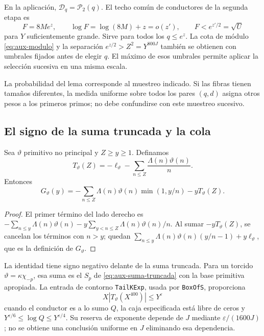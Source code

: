 En la aplicación, $\mathcal D_q=\mathcal P_2(q)$.
El techo común de conductores de la segunda etapa es
\begin{equation}
 F=8Me^z,\qquad \log F=\log(8M)+z=o(z'),\qquad
 F<e^{z'/2}=\sqrt U
 \label{eq:aux-techo}
\end{equation}
para $Y$ suficientemente grande. Sirve para todos los $q\le e^z$.
La cota de módulo \eqref{eq:aux-modulo} y la separación
$e^{z/2}>Z^2=Y^{800J}$ también se obtienen con umbrales fijados
antes de elegir $q$. El máximo de esos umbrales permite aplicar
la selección sucesiva en una misma escala.

La probabilidad del lema corresponde al muestreo indicado. Si las fibras
tienen tamaños diferentes, la medida uniforme sobre todos los pares
$(q,d)$ asigna otros pesos a los primeros primos; no debe confundirse
con este muestreo sucesivo.

\subsection{El signo de la suma truncada y la cola}

\begin{lema}
\label{lem:aux-truncacion}
Sea $\vartheta$ primitivo no principal y $Z\ge y\ge1$. Definamos
\begin{equation}
 T_\vartheta(Z)=-\ell_\vartheta-
                  \sum_{n\le Z}\frac{\Lambda(n)\vartheta(n)}n.
 \label{eq:aux-t}
\end{equation}
Entonces
\begin{equation}
 G_\vartheta(y)
 =-\sum_{n\le Z}\Lambda(n)\vartheta(n)\min(1,y/n)
                                      -yT_\vartheta(Z).
 \label{eq:aux-truncacion}
\end{equation}
\end{lema}

\begin{proof}
El primer término del lado derecho es
$-\sum_{n\le y}\Lambda(n)\vartheta(n)
-y\sum_{y<n\le Z}\Lambda(n)\vartheta(n)/n$.
Al sumar $-yT_\vartheta(Z)$, se cancelan los términos con $n>y$;
quedan $\sum_{n\le y}\Lambda(n)\vartheta(n)(y/n-1)
+y\ell_\vartheta$, que es la definición de $G_\vartheta$.
\end{proof}

La identidad tiene signo negativo delante de la suma truncada.
Para un torcido $\vartheta=\kappa\chi_{-p}$, esa suma es el
$S_p$ de \eqref{eq:aux-suma-truncada} con la base primitiva apropiada.
La entrada de contorno \texttt{TailKExp}, usada por \texttt{BoxOfS},
proporciona
\begin{equation}
 X|T_\vartheta(X^{400})|\le Y^\varepsilon
 \label{eq:aux-cola}
\end{equation}
cuando el conductor es a lo sumo $Q$, la caja especificada está libre
de ceros y $Y^{\varepsilon/6}\le\log Q\le Y^{\varepsilon/4}$.
Su reserva de exponente depende de $J$ mediante
$\varepsilon/(1600J)$; no se obtiene una conclusión uniforme en
$J$ eliminando esa dependencia.

